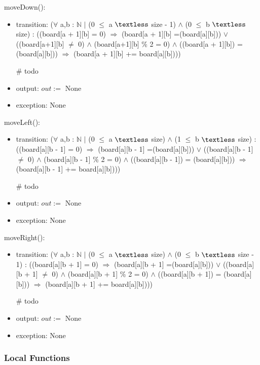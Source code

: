 \documentclass[12pt]{article}
\begin{document}
\noindent moveDown():
\begin{itemize}
\item transition: ($\forall$ a,b :  $\mathbb{N}$ $\mid$ (0 $\le$ a $\textless$ size - 1) $\land$ (0 $\le$ b $\textless$ size)   : ((board[a + 1][b] = 0)  $\Rightarrow$  (board[a + 1][b] =(board[a][b])) 
$\lor$ ((board[a+1][b] $\neq$ 0) $\land$ (board[a+1][b] \% 2 = 0) $\land$ ((board[a + 1][b]) = (board[a][b])) $\Rightarrow$ (board[a + 1][b] += board[a][b])))\\

\medskip

\# todo
\item output: $out :=$ None
\item exception: None
\end{itemize}

\noindent moveLeft():
\begin{itemize}
\item transition: ($\forall$ a,b :  $\mathbb{N}$ $\mid$ (0 $\le$ a $\textless$ size) $\land$ (1 $\le$ b $\textless$ size)   : ((board[a][b - 1] = 0)  $\Rightarrow$  (board[a][b - 1] =(board[a][b])) 
$\lor$ ((board[a][b - 1] $\neq$ 0) $\land$ (board[a][b - 1] \% 2 = 0) $\land$ ((board[a][b - 1]) = (board[a][b])) $\Rightarrow$ (board[a][b - 1] += board[a][b])))\\

\medskip

\# todo
\item output: $out :=$ None
\item exception: None
\end{itemize}

\noindent moveRight():
\begin{itemize}
\item transition: ($\forall$ a,b :  $\mathbb{N}$ $\mid$ (0 $\le$ a $\textless$ size) $\land$ (0 $\le$ b $\textless$ size - 1)   : ((board[a][b + 1] = 0)  $\Rightarrow$  (board[a][b + 1] =(board[a][b])) 
$\lor$ ((board[a][b + 1] $\neq$ 0) $\land$ (board[a][b + 1] \% 2 = 0) $\land$ ((board[a][b + 1]) = (board[a][b])) $\Rightarrow$ (board[a][b + 1] += board[a][b])))\\

\medskip

\# todo
\item output: $out :=$ None
\item exception: None
\end{itemize}

\bigskip

\subsubsection* {Local Functions}
\end{document}
